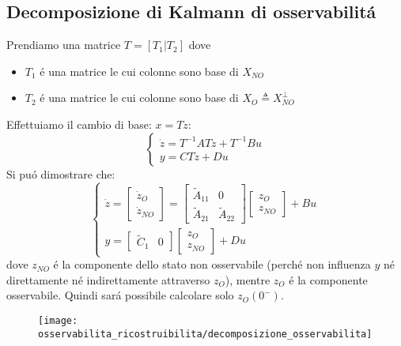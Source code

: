 \documentclass[../main.tex]{subfiles}
\begin{document}
	\subsection{Decomposizione di Kalmann di osservabilit\'a}
		Prendiamo una matrice $ T = [T_1 | T_2] $ dove
		\begin{itemize}
			\item 
				$ T_1 $ \'e una matrice le cui colonne sono base di $ X_{NO} $
			\item
				$ T_2 $ \'e una matrice le cui colonne sono base di $ X_O \triangleq X_{NO}^{\perp} $
		\end{itemize}
		Effettuiamo il cambio di base: $ x = Tz $:
		\[
			\begin{cases}
				\dot z = T^{-1}ATz + T^{-1}Bu\\
				y = CTz + Du
			\end{cases}
		\]
		Si pu\'o dimostrare che:
		\[
			\begin{cases}
				\dot z =
				\begin{bmatrix}
					\dot z_O\\
					\dot z_{NO}
				\end{bmatrix} =
				\begin{bmatrix}
					\tilde A_{11} & 0\\
					\tilde A_{21} & \tilde A_{22}
				\end{bmatrix}
				\begin{bmatrix}
					z_O\\
					z_{NO}
				\end{bmatrix}
				+ Bu
				\\[.5cm]
				y =
				\begin{bmatrix}
					\tilde C_1 & 0
				\end{bmatrix}
				\begin{bmatrix}
					z_{O}\\
					z_{NO}
				\end{bmatrix}
				+ Du
			\end{cases}
		\]
		dove $ z_{NO} $ \'e la componente dello stato non osservabile (perch\'e non influenza $ y $ n\'e direttamente n\'e indirettamente attraverso $ z_O $), mentre $ z_O $ \'e la componente osservabile. Quindi sar\'a possibile calcolare solo $ z_O(0^{-}) $.
		
		\begin{figure}[h!]
			\centering\texttt{[image: osservabilita\_ricostruibilita/decomposizione\_osservabilita]}
		\end{figure}
		
\end{document}
